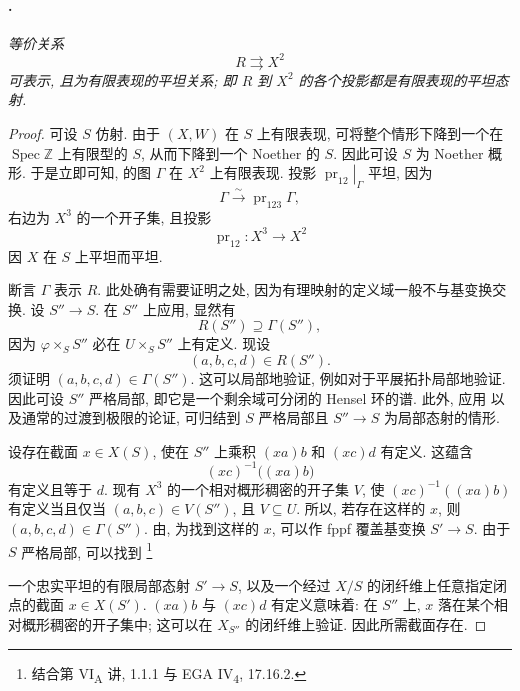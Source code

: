\paragraph{.}
\textit{等价关系
\[
  R\rightrightarrows X^2
\]
可表示, 且为有限表现的平坦关系;
即 \(R\) 到 \(X^2\) 的各个投影都是有限表现的平坦态射.}

\begin{proof}
可设 \(S\) 仿射. 由于 \((X,W)\) 在 \(S\) 上有限表现,
可将整个情形下降到一个在 \(\operatorname{Spec}\mathbb Z\) 上有限型的 \(S\),
从而下降到一个 Noether 的 \(S\).
因此可设 \(S\) 为 Noether 概形.
于是立即可知,  的图 \(\Gamma\) 在 \(X^2\) 上有限表现.
投影 \(\left.\operatorname{pr}_{12}\right|_\Gamma\) 平坦, 因为
\[
  \Gamma\xrightarrow{\sim}\operatorname{pr}_{123}\Gamma,
\]
右边为 \(X^3\) 的一个开子集, 且投影
\[
  \operatorname{pr}_{12}\colon X^3\longrightarrow X^2
\]
因 \(X\) 在 \(S\) 上平坦而平坦.

断言 \(\Gamma\) 表示 \(R\).
此处确有需要证明之处, 因为有理映射的定义域一般不与基变换交换.
设 \(S''\to S\).
在 \(S''\) 上应用, 显然有
\[
  R(S'')\supseteq\Gamma(S''),
\]
因为 \(\varphi\times_S S''\) 必在 \(U\times_S S''\) 上有定义.
现设
\[
  (a,b,c,d)\in R(S'').
\]
须证明 \((a,b,c,d)\in\Gamma(S'')\).
这可以局部地验证, 例如对于平展拓扑局部地验证.
因此可设 \(S''\) 严格局部, 即它是一个剩余域可分闭的 Hensel 环的谱.
此外, 应用 以及通常的过渡到极限的论证,
可归结到 \(S\) 严格局部且 \(S''\to S\) 为局部态射的情形.

设存在截面 \(x\in X(S)\), 使在 \(S''\) 上乘积 \((xa)b\) 和 \((xc)d\) 有定义.
这蕴含
\[
  (xc)^{-1}\bigl((xa)b\bigr)
\]
有定义且等于 \(d\).
现有 \(X^3\) 的一个相对概形稠密的开子集 \(V\),
使 \((xc)^{-1}((xa)b)\) 有定义当且仅当 \((a,b,c)\in V(S'')\), 且 \(V\subseteq U\).
所以, 若存在这样的 \(x\), 则 \((a,b,c,d)\in\Gamma(S'')\).
由,
为找到这样的 \(x\), 可以作 fppf 覆盖基变换 \(S'\to S\).
由于 \(S\) 严格局部, 可以找到\begingroup
\renewcommand{\thefootnote}{*}\footnote{结合第 VI\textsubscript{A} 讲, 1.1.1
与 EGA IV\textsubscript{4}, 17.16.2.}
\addtocounter{footnote}{-1}
\endgroup{} 一个忠实平坦的有限局部态射 \(S'\to S\),
以及一个经过 \(X/S\) 的闭纤维上任意指定闭点的截面 \(x\in X(S')\).
\((xa)b\) 与 \((xc)d\) 有定义意味着:
在 \(S''\) 上, \(x\) 落在某个相对概形稠密的开子集中;
这可以在 \(X_{S''}\) 的闭纤维上验证. 因此所需截面存在.
\end{proof}

